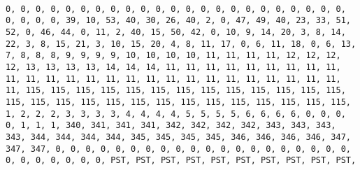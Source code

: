 \documentclass[]{article}
\begin{document}
\begin{verbatim}
                                                                                                                                                                                                                                                                                                                                                                                                                                                                                                                                                                                                                                                                                                                                                                                                                                                                                                                                                                                                                                                                                                                                                                                                                                                                                                                                                                                                                                                                                                                                                                                                                                                                                                                                                                                                                                                                                                                                                                                                                                                                                                                                                                                                                                                                                                                                                                                                                                              0, 0, 0, 0, 0, 0, 0, 0, 0, 0, 0, 0, 0, 0, 0, 0, 0, 0, 0, 0, 0, 0, 0, 0, 0, 0, 0, 39, 10, 53, 40, 30, 26, 40, 2, 0, 47, 49, 40, 23, 33, 51, 52, 0, 46, 44, 0, 11, 2, 40, 15, 50, 42, 0, 10, 9, 14, 20, 3, 8, 14, 22, 3, 8, 15, 21, 3, 10, 15, 20, 4, 8, 11, 17, 0, 6, 11, 18, 0, 6, 13, 7, 8, 8, 8, 9, 9, 9, 9, 10, 10, 10, 10, 11, 11, 11, 11, 12, 12, 12, 12, 13, 13, 13, 13, 14, 14, 14, 11, 11, 11, 11, 11, 11, 11, 11, 11, 11, 11, 11, 11, 11, 11, 11, 11, 11, 11, 11, 11, 11, 11, 11, 11, 11, 11, 115, 115, 115, 115, 115, 115, 115, 115, 115, 115, 115, 115, 115, 115, 115, 115, 115, 115, 115, 115, 115, 115, 115, 115, 115, 115, 115, 1, 2, 2, 2, 3, 3, 3, 3, 4, 4, 4, 4, 5, 5, 5, 5, 6, 6, 6, 6, 0, 0, 0, 0, 1, 1, 1, 340, 341, 341, 341, 342, 342, 342, 342, 343, 343, 343, 343, 344, 344, 344, 344, 345, 345, 345, 345, 346, 346, 346, 346, 347, 347, 347, 0, 0, 0, 0, 0, 0, 0, 0, 0, 0, 0, 0, 0, 0, 0, 0, 0, 0, 0, 0, 0, 0, 0, 0, 0, 0, 0, PST, PST, PST, PST, PST, PST, PST, PST, PST, PST, 
\end{verbatim}
\end{document}
